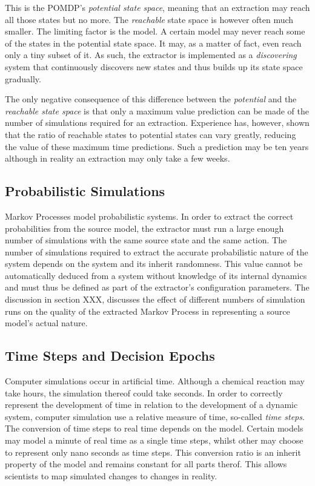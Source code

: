 This is the POMDP's \textit{potential state space}, meaning that an extraction may reach all those states but no more. The \textit{reachable} state space is however often much smaller. The limiting factor is the model. A certain model may never reach some of the states in the potential state space. It may, as a matter of fact, even reach only a tiny subset of it. As such, the extractor is implemented as a \textit{discovering} system that continuously discovers new states and thus builds up its state space gradually.

The only negative consequence of this difference between the \textit{potential} and the \textit{reachable state space} is that only a maximum value prediction can be made of the number of simulations required for an extraction. Experience has, however, shown that the ratio of reachable states to potential states can vary greatly, reducing the value of these maximum time predictions. Such a prediction may be ten years although in reality an extraction may only take a few weeks.

\subsection{Probabilistic Simulations}
\label{sec:probabilisticsimulation}

Markov Processes model probabilistic systems. In order to extract the correct probabilities from the source model, the extractor must run a large enough number of simulations with the same source state and the same action. The number of simulations required to extract the accurate probabilistic nature of the system depends on the system and its inherit randomness. This value cannot be automatically deduced from a system without knowledge of its internal dynamics and must thus be defined as part of the extractor's configuration parameters. The discussion in section XXX, discusses the effect of different numbers of simulation runs on the quality of the extracted Markov Process in representing a source model's actual nature.

\subsection{Time Steps and Decision Epochs}
\label{subsec:timestepsdecisionepochs}

Computer simulations occur in artificial time. Although a chemical reaction may take hours, the simulation thereof could take seconds. In order to correctly represent the development of time in relation to the development of a dynamic system, computer simulation use a relative measure of time, so-called \textit{time steps}. The conversion of time steps to real time depends on the model. Certain models may model a minute of real time as a single time steps, whilst other may choose to represent only nano seconds as time steps. This conversion ratio is an inherit property of the model and remains constant for all parts therof. This allows scientists to map simulated changes to changes in reality.

